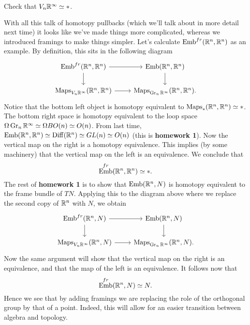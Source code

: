 \documentclass{amsart}
\DeclareMathOperator{\Emb}{Emb}
\begin{document}
\begin{exercise}
    Check that $V_n\mathbb{R}^\infty\simeq *$.
\end{exercise}

With all this talk of homotopy pullbacks (which we'll talk about in more detail
next time)
it looks like we've made things more complicated, whereas we introduced framings
to make things simpler.
Let's calculate $\Emb^{fr}(\R^n, \R^n)$ as an example.
By definition, this sits in the following diagram
\begin{equation*}
    \begin{tikzcd}
        \Emb^{fr}(\R^n, \R^n) \rar\dar & \Emb(\R^n, \R^n)\dar \\
        \Maps_{V_n\R^\infty}(\R^n, \R^n) \rar & \Maps_{\Gr_n\R^\infty}(\R^n,\R^n).
    \end{tikzcd}
\end{equation*}
Notice that the bottom left object is homotopy equivalent to $\operatorname{Maps}_*(\mathbb{R}^n,\mathbb{R}^n)\simeq *$.
The bottom right space is homotopy equivalent to the loop space $\Omega\operatorname{Gr}_n\mathbb{R}^\infty\simeq \Omega BO(n)\simeq O(n)$.
From last time, $\Emb(\R^n,\R^n)\simeq \Diff(\R^n)\simeq GL(n)\simeq O(n)$ (this is
\textbf{homework 1}). Now the vertical map on the right is a homotopy equivalence.
This implies (by some machinery) that the vertical map on the left is an equivalence.
We conclude that
\begin{equation*}
    \Emb^{fr}(\R^n,\R^n)\simeq *.
\end{equation*}
The rest of \textbf{homework 1} is to
show that $\Emb(\R^n, N)$ is homotopy equivalent to the frame bundle of $TN$. Applying this
to the diagram above where we replace the second copy of $\mathbb{R}^n$ with $N$, we obtain
\begin{equation*}
    \begin{tikzcd}
        \Emb^{fr}(\R^n, N) \rar\dar & \Emb(\R^n, N)\dar \\
        \Maps_{V_n\R^\infty}(\R^n, N) \rar & \Maps_{\Gr_n\R^\infty}(\R^n,N).
    \end{tikzcd}
\end{equation*}
Now the same argument will show that the vertical map on the right is an equivalence,
and that the map of the left is an equivalence. It follows now that
\begin{equation*}
    \Emb^{fr}(\R^n,N)\simeq N.
\end{equation*}
Hence we see that by adding framings we are replacing the role of the orthogonal group
by that of a point. Indeed, this will allow for an easier transition between algebra and topology.
\end{document}

